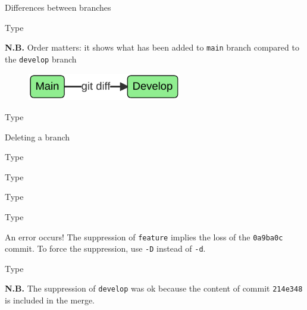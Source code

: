 \documentclass[10pt]{beamer}
\begin{document}
\begin{frame}[fragile]{Differences between branches}
\protect\hypertarget{differences-between-branches}{}

Type 



\textbf{N.B. }Order matters: it shows what has been added to \texttt{main} branch
compared to the \texttt{develop} branch

\begin{figure}[H]

{\centering \includegraphics[width=0.6\textwidth]{mermaid/diagrams-1.pdf}

}

\end{figure}

Type 

\end{frame}

\begin{frame}[fragile]{Deleting a branch}
\protect\hypertarget{deleting-a-branch}{}

Type 

Type 

Type 

Type 


An error occurs! The suppression of \texttt{feature} implies the loss
of the \texttt{0a9ba0c} commit. To force the suppression, use
\texttt{-D} instead of \texttt{-d}.

Type 

\textbf{N.B. }The suppression of \texttt{develop} was ok because the content of commit
\texttt{214e348} is included in the merge.

\end{frame}
\end{document}
